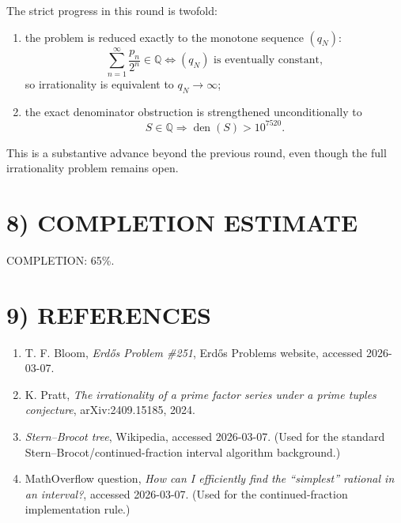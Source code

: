 The strict progress in this round is twofold:
\begin{enumerate}
\item the problem is reduced exactly to the monotone sequence \((q_N)\):
\[
\sum_{n=1}^{\infty}\frac{p_n}{2^n}\in\mathbb Q
\iff
(q_N)\text{ is eventually constant},
\]
so irrationality is equivalent to \(q_N\to\infty\);
\item the exact denominator obstruction is strengthened unconditionally to
\[
S\in\mathbb Q \Longrightarrow \operatorname{den}(S)>10^{7520}.
\]
\end{enumerate}

This is a substantive advance beyond the previous round, even though the full irrationality problem remains open.

\section*{8) COMPLETION ESTIMATE}

COMPLETION: 65\%.

\section*{9) REFERENCES}

\begin{enumerate}
\item T. F. Bloom, \emph{Erd\H{o}s Problem \#251}, Erd\H{o}s Problems website, accessed 2026-03-07.

\item K. Pratt, \emph{The irrationality of a prime factor series under a prime tuples conjecture}, arXiv:2409.15185, 2024.

\item \emph{Stern--Brocot tree}, Wikipedia, accessed 2026-03-07. (Used for the standard Stern--Brocot/continued-fraction interval algorithm background.)

\item MathOverflow question, \emph{How can I efficiently find the ``simplest'' rational in an interval?}, accessed 2026-03-07. (Used for the continued-fraction implementation rule.)
\end{enumerate}
